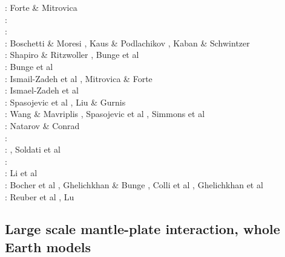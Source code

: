 \begin{scriptsize}
\nineteenninetysix: Forte \& Mitrovica \cite{fomi96} \\
\nineteenninetyeight: \cite{cava98}\\
\nineteenninetynine: \cite{samb99}\cite{samb99b}\\
\twothousandone: Boschetti \& Moresi \cite{bomo01}, Kaus \& Podlachikov \cite{kapo01}, 
                 Kaban \& Schwintzer \cite{kasc01}\\
\twothousandtwo: Shapiro \& Ritzwoller \cite{shri02}, Bunge et al \cite{burb02}\\
\twothousandthree: Bunge et al \cite{buht03}\\
\twothousandfour: Ismail-Zadeh et al \cite{isst04}, Mitrovica \& Forte \cite{mifo04}\\
\twothousandseven: Ismael-Zadeh et al \cite{isks07}\\
\twothousandeight: Spasojevic et al \cite{splg08}, Liu \& Gurnis \cite{ligu08}\\
\twothousandnine: Wang \& Mavriplis \cite{wama09}, Spasojevic et al \cite{splg09},
                  Simmons et al \cite{sifg09}\\
\twothousandtwelve: Natarov \& Conrad \cite{naco12}\\
\twothousandfourteen: \cite{wosp14}\cite{hobo14}\cite{licl14}\\
\twothousandfifteen: \cite{wahg15}\cite{cobs15}\cite{vybu15}, Soldati et al \cite{sobd15}\\
\twothousandsixteen: \cite{ghbu16}\cite{bocf16}\cite{yagu16}\cite{baum16}\cite{pric16}\\
\twothousandseventeen: Li et al \cite{ligs17}\\
\twothousandeighteen: Bocher et al \cite{bofc18}, Ghelichkhan \& Bunge \cite{ghbu18}, 
                      Colli et al \cite{cogb18}, Ghelichkhan et al \cite{ghmc18}\\
\twothousandtwenty: Reuber et al \cite{rehp20}, Lu \etal{} \cite{lufs20}
\end{scriptsize}

\subsection{Large scale mantle-plate interaction, whole Earth models}

